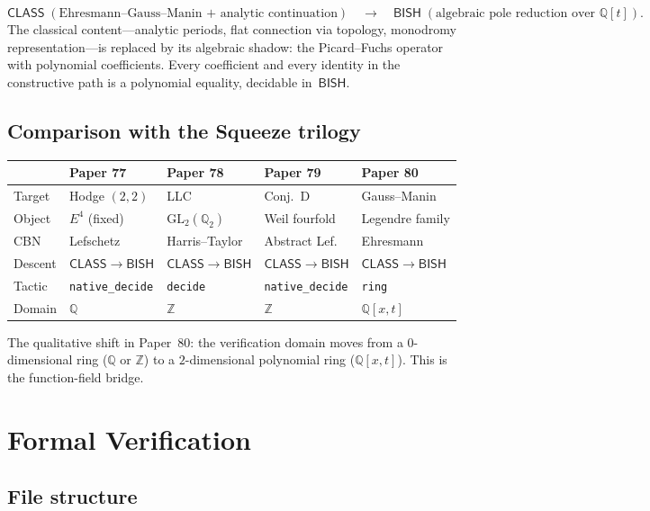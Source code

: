 \documentclass[11pt]{article}
\theoremstyle{plain}
\theoremstyle{definition}
\theoremstyle{remark}
\newcommand{\Z}{\mathbb{Z}}
\newcommand{\Q}{\mathbb{Q}}
\newcommand{\GL}{\mathrm{GL}}
\newcommand{\BISH}{\mathsf{BISH}}
\newcommand{\CLASS}{\mathsf{CLASS}}
\begin{document}
\[
  \CLASS \;(\text{Ehresmann--Gauss--Manin + analytic continuation})
  \quad\longrightarrow\quad
  \BISH \;(\text{algebraic pole reduction over } \Q[t]).
\]
The classical content---analytic periods, flat connection via
topology, monodromy representation---is replaced by its algebraic
shadow: the Picard--Fuchs operator with polynomial coefficients.
Every coefficient and every identity in the constructive path is
a polynomial equality, decidable in~$\BISH$.

\subsection{Comparison with the Squeeze trilogy}

\begin{center}
\begin{tabular}{lllll}
\toprule
& \textbf{Paper 77} & \textbf{Paper 78} & \textbf{Paper 79} & \textbf{Paper 80} \\
\midrule
Target & Hodge $(2,2)$ & LLC & Conj.~D & Gauss--Manin \\
Object & $E^4$ (fixed) & $\GL_2(\Q_2)$ & Weil fourfold & Legendre family \\
CBN & Lefschetz & Harris--Taylor & Abstract Lef. & Ehresmann \\
Descent & $\CLASS \to \BISH$ & $\CLASS \to \BISH$ & $\CLASS \to \BISH$
  & $\CLASS \to \BISH$ \\
Tactic & \texttt{native\_decide} & \texttt{decide} & \texttt{native\_decide}
  & \texttt{ring} \\
Domain & $\Q$ & $\Z$ & $\Z$ & $\Q[x, t]$ \\
\bottomrule
\end{tabular}
\end{center}

The qualitative shift in Paper~80: the verification domain moves from
a $0$-dimensional ring ($\Q$ or $\Z$) to a $2$-dimensional polynomial
ring ($\Q[x, t]$).  This is the function-field bridge.

\section{Formal Verification}\label{sec:lean}

\subsection{File structure}
\end{document}
